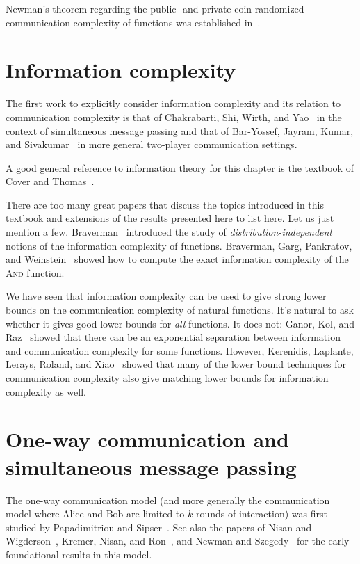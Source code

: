 Newman's theorem regarding the public- and private-coin randomized communication complexity of functions was established in~\cite{Newman91}.


\section{Information complexity}

The first work to explicitly consider information complexity and its relation to communication complexity is that of Chakrabarti, Shi, Wirth, and Yao~\cite{ChakrabartiSWY01} in the context of simultaneous message passing and that of Bar-Yossef, Jayram, Kumar, and Sivakumar~\cite{BarYossefJKS04} in more general two-player communication settings.

A good general reference to information theory for this chapter is the textbook of Cover and Thomas~\cite{CoverT06}.

There are too many great papers that discuss the topics introduced in this textbook and extensions of the results presented here to list here. Let us just mention a few. Braverman~\cite{Braverman15} introduced the study of \emph{distribution-independent} notions of the information complexity of functions.
Braverman, Garg, Pankratov, and Weinstein~\cite{Braverman13} showed how to compute the exact information complexity of the \textsc{And} function. 

We have seen that information complexity can be used to give strong lower bounds on the communication complexity of natural functions. It's natural to ask whether it gives good lower bounds for \emph{all} functions. It does not: Ganor, Kol, and Raz~\cite{GanorKR16} showed that there can be an exponential separation between information and communication complexity for some functions. However, Kerenidis, Laplante, Lerays, Roland, and Xiao~\cite{Kerenidis15} showed that many of the lower bound techniques for communication complexity also give matching lower bounds for information complexity as well.


\section{One-way communication and simultaneous message passing}

The one-way communication model (and more generally the communication model where Alice and Bob are limited to $k$ rounds of interaction) was first studied by Papadimitriou and Sipser~\cite{PapadimitriouS84}. See also the papers of Nisan and Wigderson~\cite{NisanW93}, Kremer, Nisan, and Ron~\cite{KremerNR99}, and Newman and Szegedy~\cite{NewmanS96} for the early foundational results in this model.

